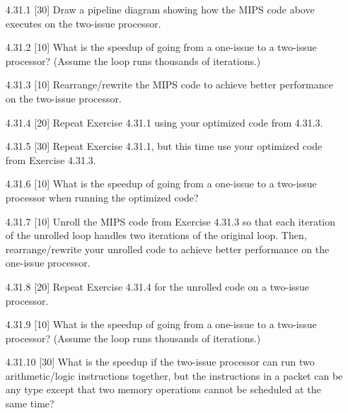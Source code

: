 \begin{enumerate}
  \item[4.31.1] [30] Draw a pipeline diagram showing how the MIPS code above
        executes on the two-issue processor.
  \item[4.31.2] [10] What is the speedup of going from a one-issue to a
        two-issue processor? (Assume the loop runs thousands of iterations.)
  \item[4.31.3] [10] Rearrange/rewrite the MIPS code to achieve better
        performance on the two-issue processor.
  \item[4.31.4] [20] Repeat Exercise 4.31.1 using your optimized code from
        4.31.3.
  \item[4.31.5] [30] Repeat Exercise 4.31.1, but this time use your
        optimized code from Exercise 4.31.3.
  \item[4.31.6] [10] What is the speedup of going from a one-issue to a
        two-issue processor when running the optimized code?
  \item[4.31.7] [10] Unroll the MIPS code from Exercise 4.31.3 so that each
        iteration of the unrolled loop handles two iterations of the original
        loop. Then, rearrange/rewrite your unrolled code to achieve better
        performance on the one-issue processor.
  \item[4.31.8] [20] Repeat Exercise 4.31.4 for the unrolled code on a
        two-issue processor.
  \item[4.31.9] [10] What is the speedup of going from a one-issue to a
        two-issue processor? (Assume the loop runs thousands of iterations.)
  \item[4.31.10] [30] What is the speedup if the two-issue processor can run
        two arithmetic/logic instructions together, but the instructions in
        a packet can be any type except that two memory operations cannot be
        scheduled at the same time?
\end{enumerate}

